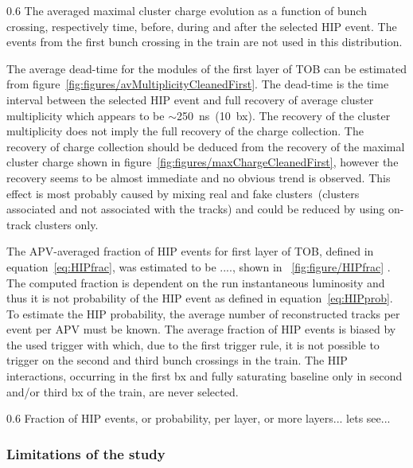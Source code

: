                  {0.6}       %
                 {The averaged maximal cluster charge evolution as a function of bunch crossing, respectively time, before, during and after the selected HIP event.  The events from the first bunch crossing in the train are not used in this distribution. } %

The average dead-time for the modules of the first layer of TOB can be estimated from figure~\ref{fig:figures/avMultiplicityCleanedFirst}. The dead-time is the time interval between the selected HIP event and full recovery of average cluster multiplicity which appears to be $\sim$250~ns~(10~bx). The recovery of the cluster multiplicity does not imply the full recovery of the charge collection. The recovery of charge collection should be deduced from the recovery of the maximal cluster charge shown in figure~\ref{fig:figures/maxChargeCleanedFirst}, however the recovery seems to be almost immediate and no obvious trend is observed. This effect is most probably caused by mixing real and fake clusters~(clusters associated and not associated with the tracks) and could be reduced by using on-track clusters only.

The APV-averaged fraction of HIP events for first layer of TOB, defined in equation~\ref{eq:HIPfrac}, was estimated to be ...., shown in ~\ref{fig:figure/HIPfrac} . The computed fraction is dependent on the run instantaneous luminosity and thus it is not probability of the HIP event as defined in equation~\ref{eq:HIPprob}. To estimate the HIP probability, the average number of reconstructed tracks per event per APV must be known. The average fraction of HIP events is biased by the used trigger with which, due to the first trigger rule, it is not possible to trigger on the second and third bunch crossings in the train. The HIP interactions, occurring in the first bx and fully saturating baseline only in second and/or third bx of the train, are never selected.
 
                 {0.6}       %
                 {Fraction of HIP events, or probability, per layer, or more layers... lets see... } %

\subsubsection{Limitations of the study}

